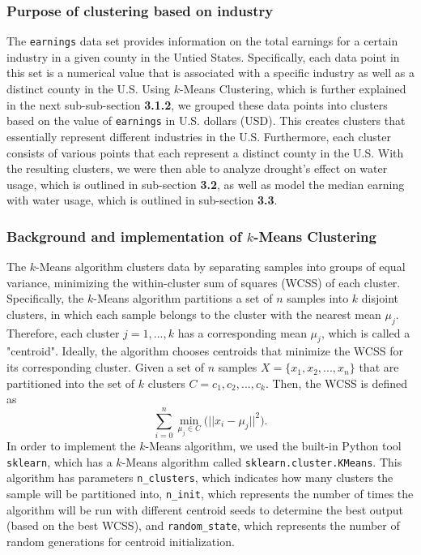 \documentclass{article}
\begin{document}
\subsubsection{Purpose of clustering based on industry}
The \texttt{earnings} data set provides information on the total earnings for a certain industry in a given county in the Untied States. Specifically, each data point in this set is a numerical value that is associated with a specific industry as well as a distinct county in the U.S. Using $k$-Means Clustering, which is further explained in the next sub-sub-section \textbf{3.1.2}, we grouped these data points into clusters based on the value of \texttt{earnings} in U.S. dollars (USD). This creates clusters that essentially represent different industries in the U.S. Furthermore, each cluster consists of various points that each represent a distinct county in the U.S. With the resulting clusters, we were then able to analyze drought's effect on water usage, which is outlined in sub-section \textbf{3.2}, as well as model the median earning with water usage, which is outlined in sub-section \textbf{3.3}.
\subsubsection{Background and implementation of $k$-Means Clustering}
The $k$-Means algorithm clusters data by separating samples into groups of equal variance, minimizing the within-cluster sum of squares (WCSS) of each cluster. Specifically, the $k$-Means algorithm partitions a set of $n$ samples into $k$ disjoint clusters, in which each sample belongs to the cluster with the nearest mean $\mu_j$. Therefore, each cluster $j=1,...,k$ has a corresponding mean $\mu_j$, which is called a "centroid". Ideally, the algorithm chooses centroids that minimize the WCSS for its corresponding cluster.\cite{sklearnKMeans:2018} Given a set of $n$ samples $X=\{x_1,x_2,...,x_n\}$ that are partitioned into the set of $k$ clusters $C=c_1,c_2,...,c_k$. Then, the WCSS is defined as
\begin{equation}
    \sum_{i=0}^n\min_{\mu_j\in C}\bigg(||x_i-\mu_j||^2\bigg).
\end{equation}
In order to implement the $k$-Means algorithm, we used the built-in Python tool \texttt{sklearn}, which has a $k$-Means algorithm called \texttt{sklearn.cluster.KMeans}. This algorithm has parameters \texttt{n\_clusters}, which indicates how many clusters the sample will be partitioned into, \texttt{n\_init}, which represents the number of times the algorithm will be run with different centroid seeds to determine the best output (based on the best WCSS), and \texttt{random\_state}, which represents the number of random generations for centroid initialization.\cite{KMeans:2018}
\end{document}
